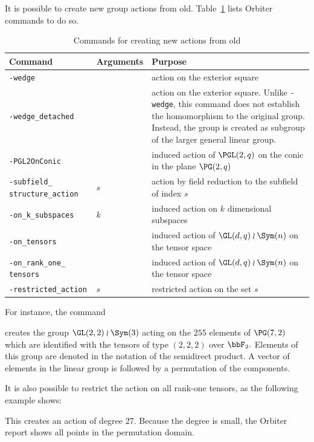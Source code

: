 It is possible to create new group actions from old.
Table~\ref{tab:modifier} lists Orbiter commands to do so.
\begin{table}
\begin{center}
\begin{tabular}{|p{4cm}|p{3cm}|p{8cm}|}
\hline
Command & Arguments & Purpose \\
\hline
\hline
\verb'-wedge' &  & action on the exterior square \\
\hline
\verb'-wedge_detached' &  & action on the exterior square. Unlike \verb'-wedge', this command does not establish the homomorphism to the original group. Instead, the group is created as subgroup of the larger general linear group.\\
\hline
\verb'-PGL2OnConic' &  & induced action of $\PGL(2,q)$ on the conic in the plane $\PG(2,q)$ \\
\hline
\verb'-subfield_' \verb'structure_action' & $s$ & action by field reduction to the subfield of index $s$\\
\hline
\verb'-on_k_subspaces' & $k$ & induced action on $k$ dimensional subspaces \\
\hline
\verb'-on_tensors' &  & induced action of $\GL(d,q) \wr \Sym(n)$ on the tensor space \\
\hline
\verb'-on_rank_one_' \verb'tensors' &  & induced action of $\GL(d,q) \wr \Sym(n)$ on the tensor space \\
\hline
\verb'-restricted_action' & $s$ & restricted action on the set $s$ \\
\hline
\end{tabular}
\end{center}
\caption{\label{tab:modifier}Commands for creating new actions from old}
\end{table}
For instance, the command 
{\tt

}
creates the group $\GL(2,2) \wr \Sym(3)$ acting on the $255$ elements 
of $\PG(7,2)$ which are identified with the 
tensors of type $(2,2,2)$ over $\bbF_2.$  
Elements of this group are denoted in the notation of the semidirect product. 
A vector of elements in the linear group is followed by a permutation of the components. 
\begin{mdframed}[style=MyFrame]

\end{mdframed}
It is also possible to restrict the action on all rank-one tensors, as the following example shows:
{\tt

}
This creates an action of degree 27. 
Because the degree is small, 
the Orbiter report shows all points in the permutation domain.
\begin{mdframed}[style=MyFrame]

\end{mdframed}


